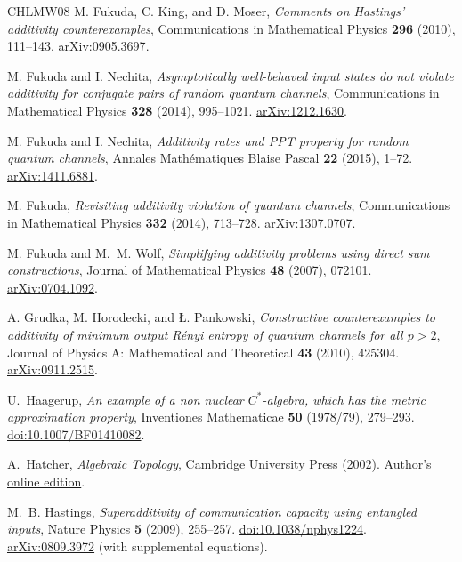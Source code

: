 \documentclass[11pt]{article}
\numberwithin{equation}{section}
\theoremstyle{boldremark}\newtheorem{remark}[theorem]{Remark}
\begin{document}
\begin{thebibliography}{CHLMW08}
M. Fukuda, C. King, and D. Moser,
\emph{Comments on Hastings' additivity counterexamples},
Communications in Mathematical Physics \textbf{296} (2010), 111--143.
\href{https://arxiv.org/abs/0905.3697}{arXiv:0905.3697}.

M. Fukuda and I. Nechita,
\emph{Asymptotically well-behaved input states do not violate additivity for conjugate pairs of random quantum channels},
Communications in Mathematical Physics \textbf{328} (2014), 995--1021.
\href{https://arxiv.org/abs/1212.1630}{arXiv:1212.1630}.

M. Fukuda and I. Nechita,
\emph{Additivity rates and PPT property for random quantum channels},
Annales Math\'ematiques Blaise Pascal \textbf{22} (2015), 1--72.
\href{https://arxiv.org/abs/1411.6881}{arXiv:1411.6881}.

M. Fukuda,
\emph{Revisiting additivity violation of quantum channels},
Communications in Mathematical Physics \textbf{332} (2014), 713--728.
\href{https://arxiv.org/abs/1307.0707}{arXiv:1307.0707}.

M. Fukuda and M.~M. Wolf,
\emph{Simplifying additivity problems using direct sum constructions},
Journal of Mathematical Physics \textbf{48} (2007), 072101.
\href{https://arxiv.org/abs/0704.1092}{arXiv:0704.1092}.

A. Grudka, M. Horodecki, and \L{}. Pankowski,
\emph{Constructive counterexamples to additivity of minimum output R\'enyi entropy of quantum channels for all $p>2$},
Journal of Physics A: Mathematical and Theoretical \textbf{43} (2010), 425304.
\href{https://arxiv.org/abs/0911.2515}{arXiv:0911.2515}.

U.~Haagerup,
\emph{An example of a non nuclear $C^*$-algebra, which has the metric
approximation property},
Inventiones Mathematicae \textbf{50} (1978/79), 279--293.
\href{https://doi.org/10.1007/BF01410082}{doi:10.1007/BF01410082}.

A.~Hatcher,
\emph{Algebraic Topology},
Cambridge University Press (2002).
\href{https://pi.math.cornell.edu/~hatcher/AT/AT.pdf}{Author's online edition}.

M.~B. Hastings,
\emph{Superadditivity of communication capacity using entangled inputs},
Nature Physics \textbf{5} (2009), 255--257.
\href{https://doi.org/10.1038/nphys1224}{doi:10.1038/nphys1224}.
\href{https://arxiv.org/abs/0809.3972}{arXiv:0809.3972} (with supplemental equations).


\end{thebibliography}
\end{document}
